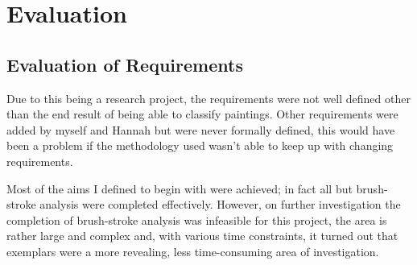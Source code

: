 \chapter{Evaluation}





\section{Evaluation of Requirements}
Due to this being a research project, the requirements were not well defined other than the end 
result of being able to classify paintings. Other requirements were added by myself and Hannah but
were never formally defined, this would have been a problem if the methodology used wasn't able to
keep up with changing requirements.

Most of the aims I defined to begin with were achieved; in fact all but brush-stroke analysis were
completed effectively. However, on further investigation the completion of brush-stroke analysis
was infeasible for this project, the area is rather large and complex and, with various time 
constraints, it turned out that exemplars were a more revealing, less time-consuming area of 
investigation.


